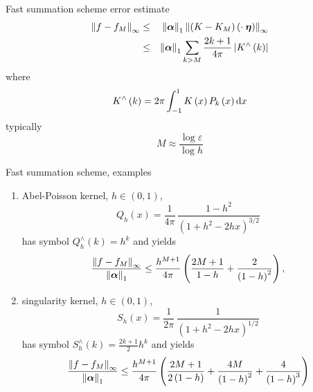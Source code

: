 \newpage
\hypertarget{fastsumS2}{}
{\color{blue} Fast summation scheme}
\vfill
error estimate
\begin{eqnarray*}
  \left\|f - f_M\right\|_{\infty}
  &\le&
  \left\|\mbox{\boldmath $\alpha$}\right\|_1 \left\|\left(K-K_M\right)\left(\cdot\:\mbox{\boldmath $\eta$}
  \right)\right\|_{\infty}\\
  &\le& \left\|\mbox{\boldmath $\alpha$}\right\|_1 \sum_{k>M}
  \frac{2k+1}{4\pi} \left| K^{\wedge}\left(k\right)\right|
\end{eqnarray*}
where 
\begin{equation*}
  K^{\wedge}\left(k\right) = 2 \pi \int_{-1}^{1} K\left(x\right)
  P_k\left(x\right) {\rm d} x
\end{equation*}
\vfill
typically
\begin{equation*}
M \approx \frac{\log \varepsilon}{\log h}
\end{equation*}
\vfill

\newpage
\hypertarget{fastsumS2}{}
{\color{blue} Fast summation scheme, examples}
\vfill
\begin{enumerate}
\item Abel-Poisson kernel, $h \in \left(0,1\right)$,
  \begin{equation*}
    Q_h\left(x\right)=\frac{1}{4\pi}\,
    \frac{1-h^2}{\left(1+h^2-2hx\right)^{3/2}}
  \end{equation*}
  has symbol $Q_h^{\wedge}\left(k\right)=h^k$ and yields
  \begin{equation*}
    \frac{\left\|f - f_{M}\right\|_{\infty}}{\left\|\mbox{\boldmath $\alpha$}\right\|_1} \le
    \frac{h^{M+1}}{4\pi}
    \left(\frac{2M+1}{1-h}+\frac{2}{\left(1-h\right)^2}\right), 
  \end{equation*}
\item singularity kernel, $h \in \left(0,1\right)$,
  \begin{equation*}
    S_h\left(x\right)=\frac{1}{2\pi}\,
    \frac{1}{\left(1+h^2-2hx\right)^{1/2}}
  \end{equation*}
  has symbol $S_h^{\wedge}\left(k\right)=\frac{2k+1}{2} h^k$ and yields
  \begin{equation*}
    \frac{\left\|f - f_{M}\right\|_{\infty}}{\left\|\mbox{\boldmath $\alpha$}\right\|_1} \le
    \frac{h^{M+1}}{4\pi} \left(\frac{2M+1}{2\left(1-h\right)}+
      \frac{4M}{\left(1-h\right)^2}+ \frac{4}{\left(1-h\right)^3}\right)
  \end{equation*}
\end{enumerate}
\vfill

